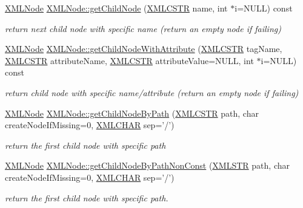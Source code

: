\begin{DoxyCompactItemize}
\hyperlink{structXMLNode}{X\-M\-L\-Node} \hyperlink{group__navigate_gac2e8c96fc51b59b6667ee02785cb6943}{X\-M\-L\-Node\-::get\-Child\-Node} (\hyperlink{xmlParser_8h_acdb0d6fd8dd596384b438d86cfb2b182}{X\-M\-L\-C\-S\-T\-R} name, int $\ast$i=N\-U\-L\-L) const 
\begin{DoxyCompactList}\small\item\em return next child node with specific name (return an empty node if failing) \end{DoxyCompactList}\item 
\hyperlink{structXMLNode}{X\-M\-L\-Node} \hyperlink{group__navigate_ga5d2775ee0704a2c028d76d267db7960a}{X\-M\-L\-Node\-::get\-Child\-Node\-With\-Attribute} (\hyperlink{xmlParser_8h_acdb0d6fd8dd596384b438d86cfb2b182}{X\-M\-L\-C\-S\-T\-R} tag\-Name, \hyperlink{xmlParser_8h_acdb0d6fd8dd596384b438d86cfb2b182}{X\-M\-L\-C\-S\-T\-R} attribute\-Name, \hyperlink{xmlParser_8h_acdb0d6fd8dd596384b438d86cfb2b182}{X\-M\-L\-C\-S\-T\-R} attribute\-Value=N\-U\-L\-L, int $\ast$i=N\-U\-L\-L) const 
\begin{DoxyCompactList}\small\item\em return child node with specific name/attribute (return an empty node if failing) \end{DoxyCompactList}\item 
\hyperlink{structXMLNode}{X\-M\-L\-Node} \hyperlink{group__navigate_ga18176d2a9e4830dcb1bca62f9c664b15}{X\-M\-L\-Node\-::get\-Child\-Node\-By\-Path} (\hyperlink{xmlParser_8h_acdb0d6fd8dd596384b438d86cfb2b182}{X\-M\-L\-C\-S\-T\-R} path, char create\-Node\-If\-Missing=0, \hyperlink{xmlParser_8h_a9f587fbd233e721e8818a3bf8102838f}{X\-M\-L\-C\-H\-A\-R} sep='/')
\begin{DoxyCompactList}\small\item\em return the first child node with specific path \end{DoxyCompactList}\item 
\hyperlink{structXMLNode}{X\-M\-L\-Node} \hyperlink{group__navigate_ga0f3b175875c5d35a0dd88b4ed836079d}{X\-M\-L\-Node\-::get\-Child\-Node\-By\-Path\-Non\-Const} (\hyperlink{xmlParser_8h_a849d96105aa0c8f64b5c10d9151a3cdc}{X\-M\-L\-S\-T\-R} path, char create\-Node\-If\-Missing=0, \hyperlink{xmlParser_8h_a9f587fbd233e721e8818a3bf8102838f}{X\-M\-L\-C\-H\-A\-R} sep='/')
\begin{DoxyCompactList}\small\item\em return the first child node with specific path. \end{DoxyCompactList}\item 

\end{DoxyCompactItemize}
